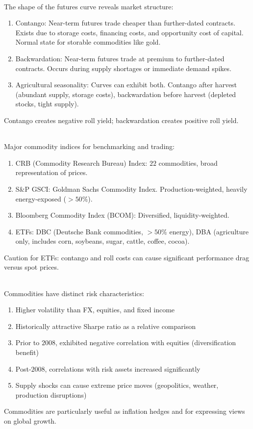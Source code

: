 \begin{remark} \\
The shape of the futures curve reveals market structure:
\begin{enumerate}[label=\roman*.]
\setlength{\itemsep}{0pt}
\item Contango: Near-term futures trade cheaper than further-dated contracts. Exists due to storage costs, financing costs, and opportunity cost of capital. Normal state for storable commodities like gold.
\item Backwardation: Near-term futures trade at premium to further-dated contracts. Occurs during supply shortages or immediate demand spikes.
\item Agricultural seasonality: Curves can exhibit both. Contango after harvest (abundant supply, storage costs), backwardation before harvest (depleted stocks, tight supply).
\end{enumerate}
Contango creates negative roll yield; backwardation creates positive roll yield.
\end{remark}

\begin{remark} \\
Major commodity indices for benchmarking and trading:
\begin{enumerate}[label=\roman*.]
\setlength{\itemsep}{0pt}
\item CRB (Commodity Research Bureau) Index: $22$ commodities, broad representation of prices.
\item S\&P GSCI: Goldman Sachs Commodity Index. Production-weighted, heavily energy-exposed ($>50\%$).
\item Bloomberg Commodity Index (BCOM): Diversified, liquidity-weighted.
\item ETFs: DBC (Deutsche Bank commodities, $>50\%$ energy), DBA (agriculture only, includes corn, soybeans, sugar, cattle, coffee, cocoa).
\end{enumerate}
Caution for ETFs: contango and roll costs can cause significant performance drag versus spot prices.
\end{remark}

\begin{remark} \\
Commodities have distinct risk characteristics:
\begin{enumerate}[label=\roman*.]
\setlength{\itemsep}{0pt}
\item Higher volatility than FX, equities, and fixed income
\item Historically attractive Sharpe ratio as a relative comparison
\item Prior to $2008$, exhibited negative correlation with equities (diversification benefit)
\item Post-$2008$, correlations with risk assets increased significantly
\item Supply shocks can cause extreme price moves (geopolitics, weather, production disruptions)
\end{enumerate}
Commodities are particularly useful as inflation hedges and for expressing views on global growth.
\end{remark}

